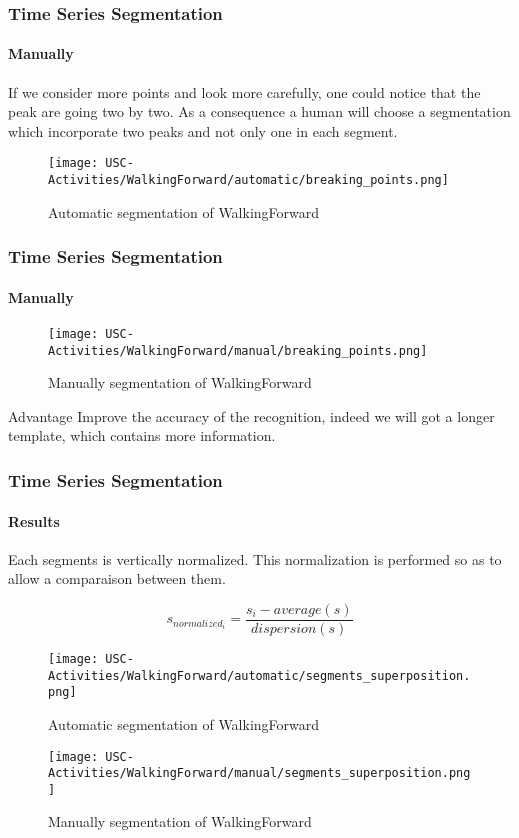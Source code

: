 \documentclass[11pt, sans, handout]{beamer}
\begin{document}
\begin{frame}
	\frametitle{Time Series Segmentation}
	\framesubtitle{Manually}
	
	If we consider more points and look more carefully, one could notice that the peak  are going two by two. As a consequence a human will choose a segmentation which incorporate two peaks and not only one in each segment. 
		
	\begin{figure}
      \texttt{[image: USC-Activities/WalkingForward/automatic/breaking\_points.png]}
      \caption{Automatic segmentation of WalkingForward}
    \end{figure}
\end{frame}

\begin{frame}
	\frametitle{Time Series Segmentation}
	\framesubtitle{Manually}
	
	\begin{figure} 	
      \texttt{[image: USC-Activities/WalkingForward/manual/breaking\_points.png]}
      \caption{Manually segmentation of WalkingForward}
	\end{figure}
	
	\begin{exampleblock}{Advantage}
	Improve the accuracy of the recognition, indeed we will got a longer template, which contains more information.
	\end{exampleblock}
	
\end{frame}

\begin{frame}
	\frametitle{Time Series Segmentation}
	\framesubtitle{Results}
	
 Each segments is vertically normalized. This normalization is performed so as to allow a comparaison between them.
 
 	\[ s_{normalized_i} = \frac{s_i - average(s)}{dispersion(s)} \]
		
	\begin{figure}
   	\begin{minipage}[c]{.46\linewidth}
      \texttt{[image: USC-Activities/WalkingForward/automatic/segments\_superposition.png]}
      \caption{Automatic segmentation of WalkingForward}
   	\end{minipage} \hfill
   	\begin{minipage}[c]{.46\linewidth}
      \texttt{[image: USC-Activities/WalkingForward/manual/segments\_superposition.png]}
      \caption{Manually segmentation of WalkingForward}
  	\end{minipage}
	\end{figure}
	
\end{frame}
\end{document}
